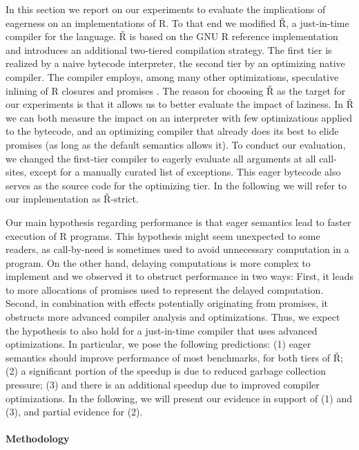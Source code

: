 \documentclass[review,nonacm,screen,acmsmall,anonymous=true]{acmart}
\renewcommand{\Rsh}{{\sf\v R}\xspace}
\newcommand{\Rshstrict}{{\sf\v R-strict}\xspace}
\begin{document}
In this section we report on our experiments to evaluate the implications of
eagerness on an implementations of R. To that end we modified \Rsh, a just-in-time
compiler for the language. \Rsh is based on the GNU R reference implementation
and introduces an additional two-tiered compilation strategy. The
first tier is realized by a naive bytecode interpreter, the second tier
by an optimizing native compiler. The compiler employs, among many other
optimizations, speculative inlining of R closures and promises \citep{dls19,
oopsla20c}.
The reason for choosing \Rsh as the target for our
experiments is that it allows us to better evaluate the impact of laziness. In
\Rsh we can both measure the impact on an interpreter with few optimizations
applied to the bytecode, and an optimizing compiler that already does its best
to elide promises (as long as the default semantics allows it).
To conduct our evaluation, we changed the first-tier
compiler to eagerly evaluate all arguments at all call-sites, except for a
manually curated list of exceptions. This eager bytecode also serves as the source
code for the optimizing tier. In the following we will refer
to our implementation as \Rshstrict.

Our main hypothesis regarding performance is that eager semantics lead to faster
execution of R programs. This hypothesis might seem unexpected to some readers,
as call-by-need is sometimes used to avoid unnecessary computation in a program.
On the other hand, delaying computations is more complex to implement and we
observed it to obstruct performance in two ways: First, it leads to more
allocations of promises used to represent the delayed computation. Second, in
combination with effects potentially originating from promises, it obstructs
more advanced compiler analysis and optimizations. Thus, we expect the hypothesis
to also hold for a just-in-time compiler that uses advanced optimizations.
In particular, we pose the following predictions:
(1) eager semantics should improve performance of most benchmarks, for both tiers
of \Rsh; (2) a significant portion of the speedup is due to reduced garbage
collection pressure; (3) and there is an additional speedup due to improved compiler
optimizations. In the following, we will present our evidence in support of (1)
and (3), and partial evidence for (2).

\paragraph{Methodology}
\end{document}
